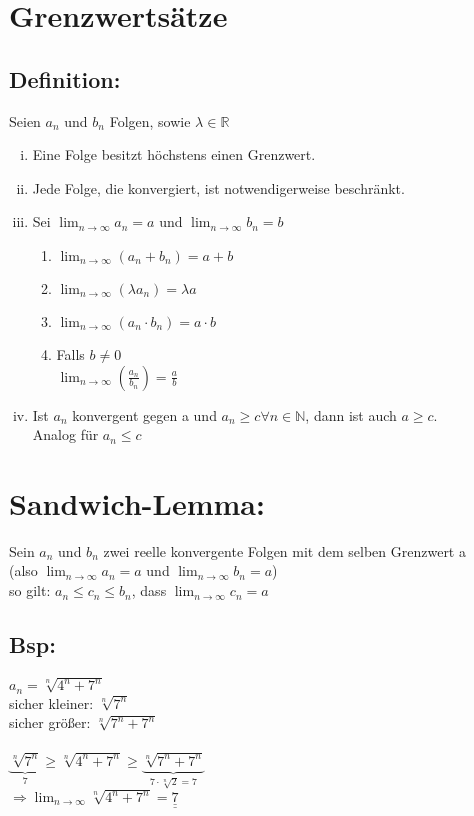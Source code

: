 \documentclass[../mainfile.tex]{article}
\begin{document}
	
	\section{Grenzwertsätze}
	\subsection*{Definition:}
		Seien $a_n$ und $b_n$ Folgen, sowie $\lambda \in \mathbb{R}$
		
		\begin{enumerate} [i)]
			\item Eine Folge besitzt höchstens einen Grenzwert. \\
			\item Jede Folge, die konvergiert, ist notwendigerweise beschränkt.\\
			\item Sei $\displaystyle \lim_{n\to\infty} a_n = a$ und $\displaystyle\lim_{n\to\infty} b_n = b$
			\begin{enumerate}
				\item $\displaystyle\lim_{n\to\infty} (a_n+b_n) = a+b$
				\item $\displaystyle\lim_{n\to\infty} (\lambda a_n) = \lambda a$
				\item $\displaystyle\lim_{n\to\infty} (a_n \cdot b_n) = a \cdot b$
				\item Falls $b\neq 0$ \\
				$\displaystyle\lim_{n\to\infty} (\frac{a_n}{b_n}) = \frac{a}{b}$
			\end{enumerate}
			\item Ist $a_n$ konvergent gegen a und $a_n \geqslant c \forall n \in \mathbb{N}$, dann ist auch $a \geqslant c$. \\
			Analog für $a_n \leqslant c$  
		\end{enumerate}
	
	\section{Sandwich-Lemma:} 
		Sein $a_n$ und $b_n$ zwei reelle konvergente Folgen mit dem selben Grenzwert a \\(also $\displaystyle \lim_{n\to\infty} a_n = a$ und $\displaystyle\lim_{n\to\infty} b_n = a$) \\
		so gilt: $a_n \leqslant c_n \leqslant b_n$, dass $\displaystyle\lim_{n\to\infty} c_n = a$ 
	\subsection*{Bsp:}
		$a_n = \sqrt[n]{4^n+7^n}$ \\  
		sicher kleiner: $\sqrt[n]{7^n}$ \\
		sicher größer: $\sqrt[n]{7^n+7^n}$ \\\\
		$\underbrace{\sqrt[n]{7^n}}_{\text{7}} \geqslant \sqrt[n]{4^n+7^n} \geqslant \underbrace{\sqrt[n]{7^n+7^n}}_{7 \cdot \sqrt[n]{2} = 7}$ \\
		$\Rightarrow \displaystyle\lim_{n\to\infty} \sqrt[n]{4^n+7^n} = \underline{\underline{7}}$
		
\end{document}

